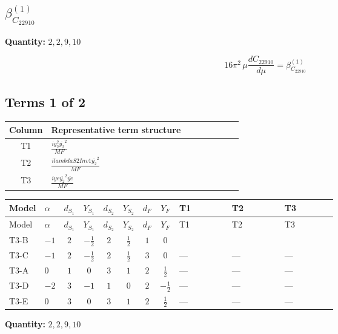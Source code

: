\documentclass[8pt]{article}
\begin{document}
\begin{landscape}
\section*{$\beta_{C_{22910}}^{(1)}$}
\noindent\textbf{Quantity: }$\mathrm{2,2,9,10}$\par\smallskip
\[16\pi^2\,\mu\frac{d C_{22910}}{d\mu}=\beta_{C_{22910}}^{(1)}\]
\subsection*{Terms 1 of 2}
\begin{center}
\begin{tabular}{@{}c >{\raggedright\arraybackslash}p{0.82\linewidth}@{}}
\toprule
Column & Representative term structure \\
\midrule
T1 & \(\displaystyle \frac{i g_{2}^{2} \overline{y_{2}}^{2}}{MF}\) \\
\midrule
T2 & \(\displaystyle \frac{i lambdaS2Inv1 \overline{y_{2}}^{2}}{MF}\) \\
\midrule
T3 & \(\displaystyle \frac{i ye \overline{y_{2}}^{2} \overline{ye}}{MF}\) \\
\midrule
\bottomrule
\end{tabular}
\end{center}
\smallskip
\tiny
\begin{longtable}{@{}llcccccc >{\raggedright\arraybackslash}p{0.21\linewidth} >{\raggedright\arraybackslash}p{0.21\linewidth} >{\raggedright\arraybackslash}p{0.21\linewidth}@{}}
\toprule
Model & $\alpha$ & $d_{S_1}$ & $Y_{S_1}$ & $d_{S_2}$ & $Y_{S_2}$ & $d_F$ & $Y_F$ & T1 & T2 & T3 \\
\midrule
\endfirsthead
\toprule
Model & $\alpha$ & $d_{S_1}$ & $Y_{S_1}$ & $d_{S_2}$ & $Y_{S_2}$ & $d_F$ & $Y_F$ & T1 & T2 & T3 \\
\midrule
\endhead
T3-B & $-1$ & $2$ & $-\frac{1}{2}$ & $2$ & $\frac{1}{2}$ & $1$ & $0$ & \scriptsize\adjustbox{max width=\linewidth}{$\begin{gathered} - \frac{3 i g_{2}^{2} \overline{y_{2}}^{2}}{4 MF}\end{gathered}$} & \scriptsize\adjustbox{max width=\linewidth}{$\begin{gathered} - \frac{i lambdaS2Inv1 \overline{y_{2}}^{2}}{2 MF}\end{gathered}$} & \scriptsize\adjustbox{max width=\linewidth}{$\begin{gathered} \frac{i ye \overline{y_{2}}^{2} \overline{ye}}{4 MF}\end{gathered}$} \\
\midrule
T3-C & $-1$ & $2$ & $-\frac{1}{2}$ & $2$ & $\frac{1}{2}$ & $3$ & $0$ & --- & --- & --- \\
\midrule
T3-A & $0$ & $1$ & $0$ & $3$ & $1$ & $2$ & $\frac{1}{2}$ & --- & --- & --- \\
\midrule
T3-D & $-2$ & $3$ & $-1$ & $1$ & $0$ & $2$ & $-\frac{1}{2}$ & --- & --- & --- \\
\midrule
T3-E & $0$ & $3$ & $0$ & $3$ & $1$ & $2$ & $\frac{1}{2}$ & --- & --- & --- \\
\midrule
\bottomrule
\end{longtable}
\clearpage
\noindent\textbf{Quantity: }$\mathrm{2,2,9,10}$\par\smallskip

\end{landscape}
\end{document}
